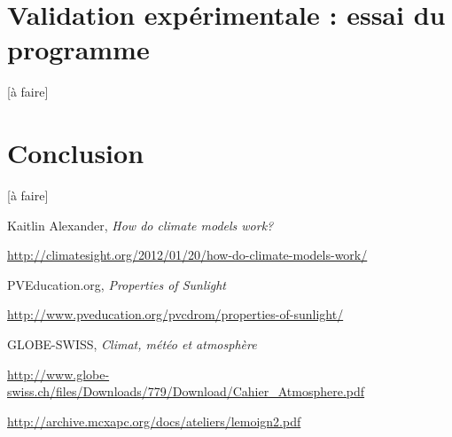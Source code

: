 \documentclass[12pt]{article}
\begin{document}
\section{Validation expérimentale : essai du programme}

[à faire]

\section{Conclusion}

[à faire]


\begin{thebibliography}{9}

Kaitlin Alexander, \textit{How do climate models work?}

\url{http://climatesight.org/2012/01/20/how-do-climate-models-work/}


PVEducation.org, \textit{Properties of Sunlight}

\url{http://www.pveducation.org/pvcdrom/properties-of-sunlight/}


GLOBE-SWISS, \textit{Climat, météo et atmosphère}

\url{http://www.globe-swiss.ch/files/Downloads/779/Download/Cahier_Atmosphere.pdf}




\url{http://archive.mcxapc.org/docs/ateliers/lemoign2.pdf}


\end{thebibliography}
\end{document}
